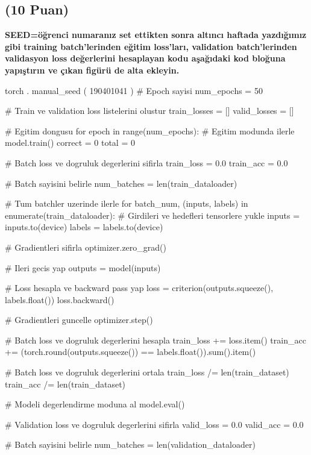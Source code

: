 \documentclass[11pt]{article}
\begin{document}
\subsection{(10 Puan)} \textbf{SEED=öğrenci numaranız set ettikten sonra altıncı haftada yazdığımız gibi training batch'lerinden eğitim loss'ları, validation batch'lerinden validasyon loss değerlerini hesaplayan kodu aşağıdaki kod bloğuna yapıştırın ve çıkan figürü de alta ekleyin.}

\begin{python}
torch . manual_seed ( 190401041 )
# Epoch sayisi
num_epochs = 50

# Train ve validation loss listelerini olustur
train_losses = []
valid_losses = []

# Egitim dongusu
for epoch in range(num_epochs):
    # Egitim modunda ilerle
    model.train()
    correct = 0
    total = 0

    # Batch loss ve dogruluk degerlerini sifirla
    train_loss = 0.0
    train_acc = 0.0

    # Batch sayisini belirle
    num_batches = len(train_dataloader)

    # Tum batchler uzerinde ilerle
    for batch_num, (inputs, labels) in enumerate(train_dataloader):
        # Girdileri ve hedefleri tensorlere yukle
        inputs = inputs.to(device)
        labels = labels.to(device)

        # Gradientleri sifirla
        optimizer.zero_grad()

        # Ileri gecis yap
        outputs = model(inputs)

        # Loss hesapla ve backward pass yap
        loss = criterion(outputs.squeeze(), labels.float())
        loss.backward()

        # Gradientleri guncelle
        optimizer.step()

        # Batch loss ve dogruluk degerlerini hesapla
        train_loss += loss.item()
        train_acc += (torch.round(outputs.squeeze()) == labels.float()).sum().item()

    # Batch loss ve dogruluk degerlerini ortala
    train_loss /= len(train_dataset)
    train_acc /= len(train_dataset)

    # Modeli degerlendirme moduna al
    model.eval()

    # Validation loss ve dogruluk degerlerini sifirla
    valid_loss = 0.0
    valid_acc = 0.0

    # Batch sayisini belirle
    num_batches = len(validation_dataloader)


\end{python}
\end{document}
